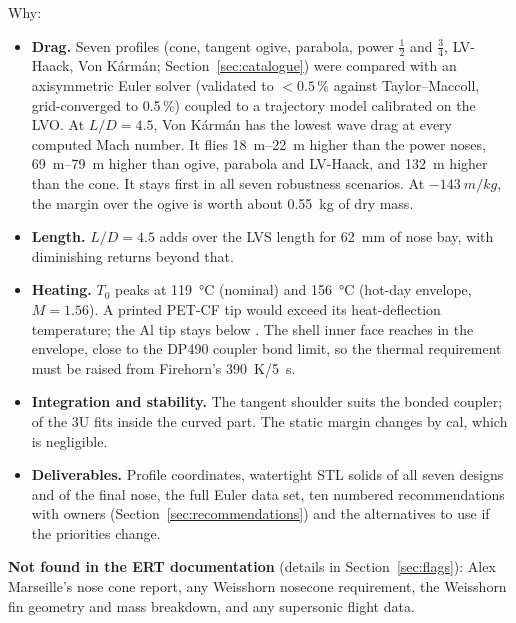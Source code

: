 \vspace{6pt}
\noindent Why:
\begin{itemize}[leftmargin=*,itemsep=2pt]
\item \textbf{Drag.} Seven profiles (cone, tangent ogive, parabola, power $\tfrac12$ and
$\tfrac34$, LV-Haack, Von K\'arm\'an; Section~\ref{sec:catalogue}) were compared with an
axisymmetric Euler solver (validated to $<0.5\,\%$ against Taylor--Maccoll, grid-converged to
0.5\,\%) coupled to a trajectory model calibrated on the LVO. At $L/D = 4.5$, Von K\'arm\'an has
the lowest wave drag at every computed Mach number. It flies \SIrange{18}{22}{m} higher than the
power noses, \SIrange{69}{79}{m} higher than ogive, parabola and LV-Haack, and \SI{132}{m}
higher than the cone. It stays first in all seven robustness scenarios. At $-\SI{143}{m/kg}$, the
margin over the ogive is worth about \SI{0.55}{kg} of dry mass.
\item \textbf{Length.} $L/D = 4.5$ adds \TRADELEN{} over the LVS length for \SI{62}{mm} of nose
bay, with diminishing returns beyond that.
\item \textbf{Heating.} $T_0$ peaks at \SI{119}{\celsius} (nominal) and \SI{156}{\celsius}
(hot-day envelope, $M=1.56$). A printed PET-CF tip would exceed its heat-deflection temperature;
the Al tip stays below \TIPAL. The shell inner face reaches \SHELLENV{} in the envelope, close
to the DP490 coupler bond limit, so the thermal requirement must be raised from Firehorn's
\SI{390}{K}/\SI{5}{s}.
\item \textbf{Integration and stability.} The tangent shoulder suits the bonded coupler; \FINTHREEU{}
of the 3U fits inside the curved part. The static margin changes by \FINDSM{} cal, which is
negligible.
\item \textbf{Deliverables.} Profile coordinates, watertight STL solids of all seven designs and
of the final nose, the full Euler data set, ten numbered recommendations with owners
(Section~\ref{sec:recommendations}) and the alternatives to use if the priorities change.
\end{itemize}

\noindent\textbf{Not found in the ERT documentation} (details in Section~\ref{sec:flags}): Alex
Marseille's nose cone report, any Weisshorn nosecone requirement, the Weisshorn fin geometry and
mass breakdown, and any supersonic flight data.
